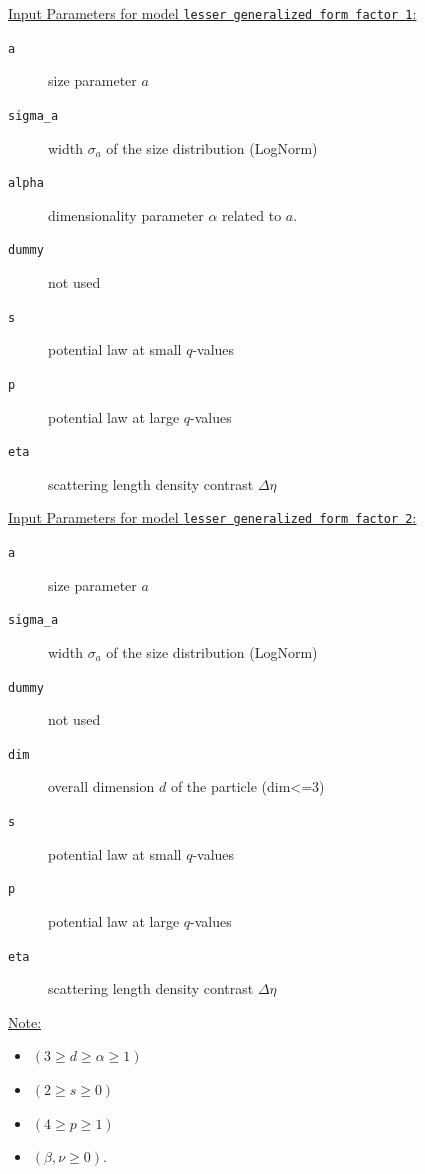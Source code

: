 \underline{Input Parameters for model \texttt{lesser generalized form factor 1}:}\\
\begin{description}
\item[\texttt{a}] size parameter $a$
\item[\texttt{sigma\_a}] width $\sigma_a$ of the size distribution (LogNorm)
\item[\texttt{alpha}] dimensionality parameter $\alpha$ related to $a$.
\item[\texttt{dummy}] not used
\item[\texttt{s}] potential law at small $q$-values
\item[\texttt{p}] potential law at large $q$-values
\item[\texttt{eta}] scattering length density contrast $\Delta\eta$
\end{description}

\vspace{5mm}

\underline{Input Parameters for model \texttt{lesser generalized form factor 2}:}\\
\begin{description}
\item[\texttt{a}] size parameter $a$
\item[\texttt{sigma\_a}] width $\sigma_a$ of the size distribution (LogNorm)
\item[\texttt{dummy}] not used
\item[\texttt{dim}] overall dimension $d$ of the particle (dim<=3)
\item[\texttt{s}] potential law at small $q$-values
\item[\texttt{p}] potential law at large $q$-values
\item[\texttt{eta}] scattering length density contrast $\Delta\eta$
\end{description}

\vspace{5mm}

\underline{Note:}
\begin{itemize}
\item $(3\geq d\geq \alpha\geq 1)$
\item $(2\geq s\geq 0)$
\item  $(4\geq p \geq 1)$
\item $(\beta,\nu\geq 0)$.
\end{itemize}

